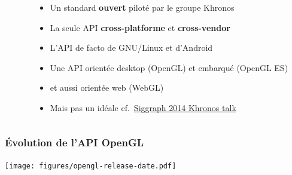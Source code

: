 \begin{frame}
\begin{columns}
\begin{column}{.2\textwidth}
\begin{center}
      \end{center}
    \end{column}
    \begin{column}{.8\textwidth}
      \begin{itemize}
      \item Un standard \textbf{ouvert} piloté par le groupe Khronos
      \item La seule API \textbf{cross-platforme} et \textbf{cross-vendor} %
      \item L'API de facto de GNU/Linux et d'Android
      \item Une API orientée desktop (OpenGL) et embarqué (OpenGL ES)
      \item et aussi orientée web (WebGL)
      \item \alert{Mais pas un idéale} cf.\ \href{https://www.khronos.org/assets/uploads/developers/library/2014-siggraph-bof/OpenGL-Ecosystem-BOF_Aug14.pdf}{Siggraph 2014 Khronos talk}
      \end{itemize}
    \end{column}
  \end{columns}
\end{frame}

\begin{frame}
  \frametitle{Évolution de l'API OpenGL}
  \begin{center}
    \texttt{[image: figures/opengl-release-date.pdf]} %
  \end{center}
\end{frame}

